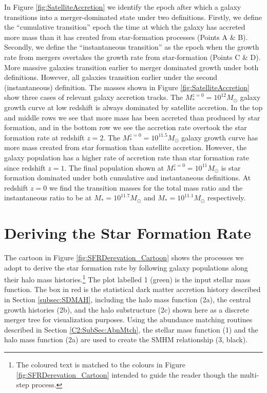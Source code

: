 In Figure \ref{fig:SatelliteAccretion} we identify the epoch after which a galaxy transitions into a merger-dominated state under two definitions. Firstly, we define the ``cumulative transition'' epoch the time at which the galaxy has accreted more mass than it has created from star-formation processes (Points A \& B). Secondly, we define the ``instantaneous transition'' as  the epoch when the growth rate from mergers overtakes the growth rate from star-formation (Points C \& D). More massive galaxies transition earlier to merger dominated growth under both definitions. However, all galaxies transition earlier under the second (instantaneous) definition. The masses shown in Figure \ref{fig:SatelliteAccretion} show three cases of relevant galaxy accretion tracks. The $M^{z=0}_* = 10^{12} M_{\odot}$ galaxy growth curve at low redshift is always dominated by satellite accretion. In the top and middle rows we see that more mass has been accreted than produced by star formation, and in the bottom row we see the accretion rate overtook the star formation rate at redshift $z=2$. The $M^{z=0}_* = 10^{11.5} M_{\odot}$ galaxy growth curve has more mass created from star formation than satellite accretion. However, the galaxy population has a higher rate of accretion rate than star formation rate since redshift $z = 1$. The final population shown at $M^{z=0}_* = 10^{11} M_{\odot}$ is star formation dominated under both cumulative and instantaneous definitions. At redshift $z = 0$ we find the transition masses for the total mass ratio and the instantaneous ratio to be at $M_* = 10^{11.7} M_{\odot}$ and $M_* = 10^{11.1} M_{\odot}$ respectively.

\section{Deriving the Star Formation Rate}
\label{sec:SFR_Dev}

The cartoon in Figure \ref{fig:SFRDerevation_Cartoon} shows the processes we adopt to derive the star formation rate by following galaxy populations along their halo mass histories.\footnote{The coloured text is matched to the colours in Figure \ref{fig:SFRDerevation_Cartoon} intended to guide the reader though the multi-step process.} \textcolor{MPLgreen}{The plot labelled 1 (green) is the input stellar mass function.} \textcolor{MPLred}{The box in red is the statistical dark matter accretion history described in Section \ref{subsec:SDMAH}, including the halo mass function (2a), the central growth histories (2b), and the halo substructure (2c) shown here as a discrete merger tree for visualization purposes.} Using the abundance matching routines described in Section \ref{C2:SubSec:AbnMtch}, the \textcolor{MPLgreen}{stellar mass function (1)} and the \textcolor{MPLred}{halo mass function (2a)} are used to create the SMHM relationship (3, black).


